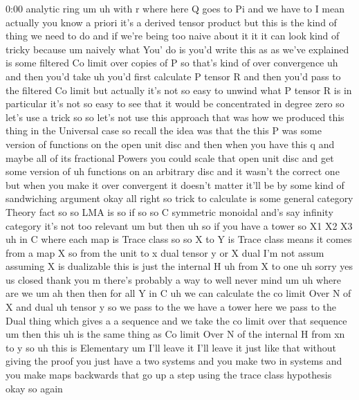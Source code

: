 \begin{unfinished}{0:00}
analytic
ring
um  uh  with  r  where  here  Q  goes  to
Pi  and  we  have  to  I  mean  actually  you
know  a  priori  it's  a  derived  tensor
product  but  this  is  the  kind  of  thing  we
need  to  do  and  if  we're  being  too  naive
about  it  it  it  can  look  kind  of  tricky
because  um  naively  what  You'  do  is  you'd
write  this  as  as  we've  explained  is  some
filtered  Co  limit  over  copies  of  P  so
that's  kind  of  over
convergence  uh  and  then  you'd  take  uh
you'd  first  calculate  P  tensor  R  and
then  you'd  pass  to  the  filtered  Co  limit
but  actually  it's  not  so  easy  to  unwind
what  P  tensor  R  is  in  particular  it's
not  so  easy  to  see  that  it  would  be
concentrated  in  degree  zero  so  let's  use
a  trick  so  so  let's  not  use  this
approach
that  was  how  we  produced  this  thing  in
the  Universal  case  so  recall  the  idea
was  that  the  this  P  was  some  version  of
functions  on  the  open  unit  disc  and  then
when  you  have  this  q  and  maybe  all  of
its  fractional  Powers  you  could  scale
that  open  unit  disc  and  get  some  version
of  uh  functions  on  an  arbitrary  disc  and
it  wasn't  the  correct  one  but  when  you
make  it  over  convergent  it  doesn't
matter  it'll  be  by  some  kind  of
sandwiching
argument  okay  all  right  so  trick  to
calculate  is  some  general  category
Theory  fact  so  so  LMA
is  so
if  so  so  C  symmetric
monoidal  and's  say  infinity  category
it's  not  too  relevant  um  but  then  uh  so
if  you  have  a
tower  so  X1
X2
X3  uh  in  C  where  each
map  is  Trace
class  so  so  X  to  Y  is  Trace
class  means  it  comes
from  a
map  X  so  from  the  unit  to  x  dual  tensor
y  or  X  dual  I'm  not  assum  assuming  X  is
dualizable  this  is  just  the  internal  H
uh  from  X  to
one
uh  sorry  yes  us  closed  thank
you  m  there's  probably  a  way  to  well
never
mind
um
uh  where  are
we  um  ah  then
then  for  all  Y  in  C  uh  we  can  calculate
the  co  limit  Over  N  of  X  and  dual  uh
tensor
y  so  we  pass  to  the  we  have  a  tower  here
we  pass  to  the  Dual  thing  which  gives  a
a  sequence  and  we  take  the  co  limit  over
that  sequence  um  then  this  uh  is  the
same  thing  as  Co  limit  Over  N  of  the
internal  H  from  xn  to
y
so
uh  this  is
Elementary  um  I'll  leave  it  I'll  leave
it  just  like  that  without  giving  the
proof  you  just  have  a  two  systems  and
you  make  two  in  systems  and  you  make
maps  backwards  that  go  up  a  step  using
the  trace  class  hypothesis  okay  so  again

\end{unfinished}
